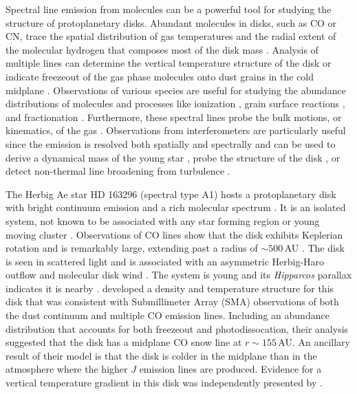 Spectral line emission from molecules can be a powerful tool for studying the 
structure of protoplanetary disks.  Abundant molecules in disks, such as CO or 
CN, trace the spatial distribution of gas temperatures and the radial extent of 
the molecular hydrogen that composes most of the disk mass 
\citep{koerner93,guilloteau13}.  Analysis of multiple lines can determine the 
vertical temperature structure of the disk \citep{dartois03} or indicate 
freezeout of the gas phase molecules onto dust grains in the cold midplane 
\citep{qi11}.  Observations of various species are useful for studying the 
abundance distributions of molecules and processes like ionization 
\citep{oberg11}, grain surface reactions \citep{dutrey11}, and fractionation 
\citep{oberg12}.  Furthermore, these spectral lines probe the bulk motions, or 
kinematics, of the gas \citep{beckwith93}.  Observations from interferometers 
are particularly useful since the emission is resolved both spatially and 
spectrally and can be used to derive a dynamical mass of the young star 
\citep{guilloteau98,simon00}, probe the structure of the disk 
\citep{dutrey08,panic10}, or detect non-thermal line broadening from turbulence 
\citep{hughes11,guilloteau12}.

The Herbig Ae star HD 163296 (spectral type A1) hosts a protoplanetary disk with
bright continuum emission \citep{allen76,mannings97,natta04} and a rich
molecular spectrum \citep{qi01,thi01,thi04,qi13}.  It is an isolated system, not
known to be associated with any star forming region or young moving cluster 
\citep{finkenzeller84}.  Observations of CO lines show that the disk exhibits
Keplerian rotation \citep{mannings97,isella07,hughes08} and is remarkably large,
extending past a radius of $\sim 500$\,AU \citep{isella07}.  The disk is seen in
scattered light \citep{grady00} and is associated with an asymmetric Herbig-Haro
outflow \citep{devine00} and molecular disk wind \citep{klaassen13}.  The system
is young \citep[$\sim 5$\,Myr;][]{natta04} and its {\it Hipparcos} parallax 
indicates it is nearby \citep[$d= 122^{+17}_{-13}$\,pc;][]{vandenancker98}. 
\citet{qi11} developed a density and temperature structure for this disk that 
was consistent with Submillimeter Array (SMA) observations of both the dust 
continuum and multiple CO emission lines.  Including an abundance distribution 
that accounts for both freezeout and photodissocation, their analysis suggested 
that the disk has a midplane CO snow line at $r\sim155$\,AU.  An ancillary 
result of their model is that the disk is colder in the midplane than in the 
atmosphere where the higher $J$ emission lines are produced.  Evidence for a 
vertical temperature gradient in this disk was independently presented by 
\citet{akiyama11}.

